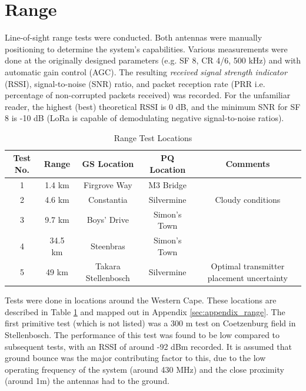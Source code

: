 \graphicspath{{./figures}}

\section{Range}

Line-of-sight range tests were conducted. Both antennas were manually positioning to determine the system's capabilities. Various measurements were done at the originally designed parameters (e.g. SF 8, CR 4/6, 500 kHz) and with automatic gain control (AGC). The resulting \textit{received signal strength indicator} (RSSI), signal-to-noise (SNR) ratio, and packet reception rate (PRR i.e. percentage of non-corrupted packets received) was recorded. For the unfamiliar reader, the highest (best) theoretical RSSI is 0 dB, and the minimum SNR for SF 8 is -10 dB (LoRa is capable of demodulating negative signal-to-noise ratios).

\begin{table}[!htb]
  \centering
  \renewcommand{\arraystretch}{1.2}
  \hspace*{-1.5cm}
  \begin{tabular}{ |c|c|c|c|c| }
  \hline
  \textbf{Test No.}         & \textbf{Range}        & \textbf{GS Location}      & \textbf{PQ Location}      & \textbf{Comments} \\ 
  \hline
  1                         
  & 1.4 km  
  & Firgrove Way
  & M3 Bridge 
  & \\ \hline
  2
  & 4.6 km  
  & Constantia
  & Silvermine
  & Cloudy conditions \\ \hline
  3
  & 9.7 km  
  & Boys' Drive
  & Simon's Town
  & \\ \hline
  4
  & 34.5 km  
  & Steenbras
  & Simon's Town
  & \\ \hline
  5
  & 49 km  
  & Takara Stellenbosch  
  & Silvermine
  & Optimal transmitter placement uncertainty \\ \hline
  \end{tabular}
  \caption{Range Test Locations}
  \label{tab:rangeTestLocations}
\end{table}

Tests were done in locations around the Western Cape. These locations are described in Table \ref{tab:rangeTestLocations} and mapped out in Appendix \ref{sec:appendix_range}. The first primitive test (which is not listed) was a 300 m test on Coetzenburg field in Stellenbosch. The performance of this test was found to be low compared to subsequent tests, with an RSSI of around -92 dBm recorded. It is assumed that ground bounce was the major contributing factor to this, due to the low operating frequency of the system (around 430 MHz) and the close proximity (around 1m) the antennas had to the ground.

